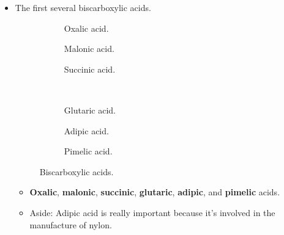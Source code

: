 \documentclass[../notes.tex]{subfiles}
\begin{document}
\begin{itemize}
\begin{itemize}
\begin{itemize}
        \end{itemize}
    \end{itemize}
    \item The first several biscarboxylic acids.
    \begin{figure}[h!]
        \centering
        \footnotesize
        \begin{subfigure}[b]{0.25\linewidth}
            \centering
            \caption{Oxalic acid.}
            \label{fig:biscarboxylica}
        \end{subfigure}
        \begin{subfigure}[b]{0.25\linewidth}
            \centering
            \caption{Malonic acid.}
            \label{fig:biscarboxylicb}
        \end{subfigure}
        \begin{subfigure}[b]{0.25\linewidth}
            \centering
            \caption{Succinic acid.}
            \label{fig:biscarboxylicc}
        \end{subfigure}\\[2em]
        \begin{subfigure}[b]{0.25\linewidth}
            \centering
            \caption{Glutaric acid.}
            \label{fig:biscarboxylicd}
        \end{subfigure}
        \begin{subfigure}[b]{0.25\linewidth}
            \centering
            \caption{Adipic acid.}
            \label{fig:biscarboxylice}
        \end{subfigure}
        \begin{subfigure}[b]{0.25\linewidth}
            \centering
            \caption{Pimelic acid.}
            \label{fig:biscarboxylicf}
        \end{subfigure}
        \caption{Biscarboxylic acids.}
        \label{fig:biscarboxylic}
    \end{figure}
    \begin{itemize}
        \item \textbf{Oxalic}, \textbf{malonic}, \textbf{succinic}, \textbf{glutaric}, \textbf{adipic}, and \textbf{pimelic} acids.
        \item Aside: Adipic acid is really important because it's involved in the manufacture of nylon.

\end{itemize}
\end{itemize}
\end{document}
